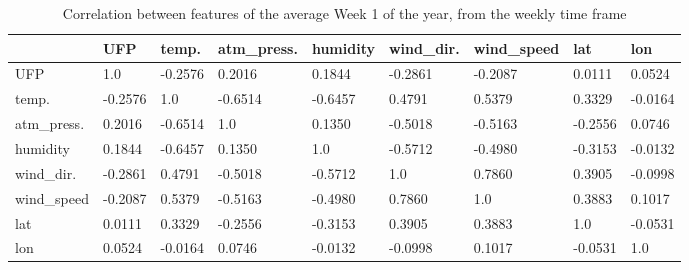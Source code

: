 \documentclass[11pt,a4paper,titlepage]{book}
\begin{document}
\begin{table}[ht]
    \small
    \begin{tabular}{@{}lllllllll@{}}
    \toprule
                & UFP     & temp.   & atm\_press. & humidity & wind\_dir. & wind\_speed & lat     & lon     \\ \midrule
    UFP         & 1.0     & -0.2576 & 0.2016      & 0.1844   & -0.2861    & -0.2087     & 0.0111  & 0.0524  \\
    temp.       & -0.2576 & 1.0     & -0.6514     & -0.6457  & 0.4791     & 0.5379      & 0.3329  & -0.0164 \\
    atm\_press. & 0.2016  & -0.6514 & 1.0         & 0.1350   & -0.5018    & -0.5163     & -0.2556 & 0.0746  \\
    humidity    & 0.1844  & -0.6457 & 0.1350      & 1.0      & -0.5712    & -0.4980     & -0.3153 & -0.0132 \\
    wind\_dir.  & -0.2861 & 0.4791  & -0.5018     & -0.5712  & 1.0        & 0.7860      & 0.3905  & -0.0998 \\
    wind\_speed & -0.2087 & 0.5379  & -0.5163     & -0.4980  & 0.7860     & 1.0         & 0.3883  & 0.1017  \\
    lat         & 0.0111  & 0.3329  & -0.2556     & -0.3153  & 0.3905     & 0.3883      & 1.0     & -0.0531 \\
    lon         & 0.0524  & -0.0164 & 0.0746      & -0.0132  & -0.0998    & 0.1017      & -0.0531 & 1.0     \\ \bottomrule
    \end{tabular}
    \caption{Correlation between features of the average Week 1 of the year, from the weekly time frame}
    \label{cleanair:correlation-table-week1}
\end{table}
\end{document}
